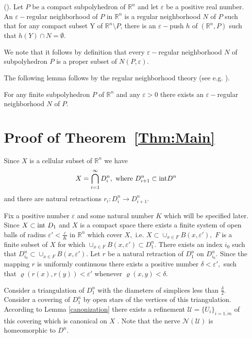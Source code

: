 \begin{dfn} {\rm (}\cite{GS, H}{\rm )}.
Let $P$ be a compact subpolyhedron of $\mathbb{R}^n$ and let
$\varepsilon$ be a positive real number. {\rm An
$\varepsilon-$regular neighborhood} of $P$ in $\mathbb{R}^n$ is a
regular neighborhood $N$ of $P$ such that for any compact subset Y
of $\mathbb{R}^n\setminus P$, there is an $\varepsilon-$push $h$
of $(\mathbb{R}^n, P)$ such that $h(Y) \cap N = \emptyset.$
\end{dfn}

We note that it follows by definition that every
$\varepsilon-$regular neighborhood $N$ of subpolyhedron $P$ is a
proper subset of $N(P, \varepsilon).$
\medskip

The following lemma follows by the regular neighborhood theory
(see  e.g. \cite{GS, H}).

\begin{lmm}\label{RegularNeighborhood}
For any finite subpolyhedron $P$ of $\mathbb{R}^n$ and any
$\varepsilon > 0$ there exists an $\varepsilon-$regular
neighborhood $N$ of $P.$
\end{lmm}

\section{Proof of Theorem~\ref{Thm:Main} }

Since $X$ is a cellular subset of $\mathbb{R}^n$ we have $$X =
\bigcap_{i=1}^{\infty}D^n_i, \ \mbox{where} \ D^n_{i+1} \subset
{\rm int} D^n$$ and there are natural retractions $r_i: D^n_i \to
D^n_{i+1}.$

Fix a positive number $\varepsilon$ and some natural number $K$
which will be specified later. Since $X \subset {\rm int}\ D_1$
and $X$ is a compact space there exists a finite system of open
balls of radius $\varepsilon' < \frac{\varepsilon}{K}$ in
$\mathbb{R}^n$ which cover $X,$ i.e. $X \subset \cup_{x \in F}
B(x, \varepsilon'),$ $F$ is a finite subset of $X$ for which
$\cup_{x \in F} B(x, \varepsilon')\subset D^n_1.$ There exists an
index $i_0$ such that $D_{i_0}^n \subset \cup_{x\in F} B(x,
\varepsilon').$ Let $r$ be a natural retraction of $D_1^n$ on
$D_{i_0}^n.$  Since the mapping $r$ is uniformly continuous there
exists a positive number $\delta < \varepsilon',$ such that
$\varrho (r(x), r(y)) < \varepsilon'$ whenever $\varrho (x, y) <
\delta.$ 

Consider a triangulation of $D_1^n$ with the diameters of
simplices less than $\frac{\delta}{2}.$ Consider a covering of
$D_1^n$ by open stars of the vertices of this triangulation.
According to Lemma \ref{canonization} there exists a refinement
$\mathcal{U} = \{U_i\}_{i=\overline{1,m}}$ of this covering which
is canonical on $X$ . Note that the nerve
$\mathcal{N}(\mathcal{U})$ is homeomorphic to $D^n.$

